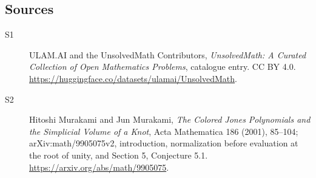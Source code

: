 \documentclass[11pt]{article}
\begin{document}
\subsection{Sources}
\begin{description}
\item[\hypertarget{source:statement:1}{S1}] ULAM.AI and the UnsolvedMath Contributors, \emph{UnsolvedMath: A Curated Collection of Open Mathematics Problems}, catalogue entry. CC BY 4.0. \url{https://huggingface.co/datasets/ulamai/UnsolvedMath}.
\item[\hypertarget{source:statement:2}{S2}] Hitoshi Murakami and Jun Murakami, \emph{The Colored Jones Polynomials and the Simplicial Volume of a Knot}, Acta Mathematica 186 (2001), 85--104; arXiv:math/9905075v2, introduction, normalization before evaluation at the root of unity, and Section 5, Conjecture 5.1. \url{https://arxiv.org/abs/math/9905075}.
\end{description}
\label{end:statement}
\end{document}
